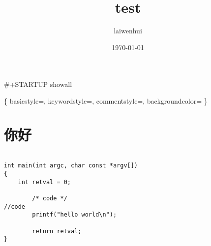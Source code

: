 \documentclass[11pt]{article}
\author{laiwenhui}
\date{\today}
\title{test}
\begin{document}
\maketitle
\setcounter{tocdepth}{2}
\tableofcontents

\#+STARTUP showall
\newpage



\lstset\{
  basicstyle=\color{fore},
  keywordstyle=\color{keywords},
  commentstyle=\color{comments},
  backgroundcolor=\color{back}
\}


\section{你好}
\label{sec:orgec4f51c}
\lstset{language=C,label= ,caption= ,captionpos=b,numbers=none}
\begin{lstlisting}

int main(int argc, char const *argv[])
{
    int retval = 0;

        /* code */
//code
        printf("hello world\n");

        return retval;
}


\end{lstlisting}
\end{document}
